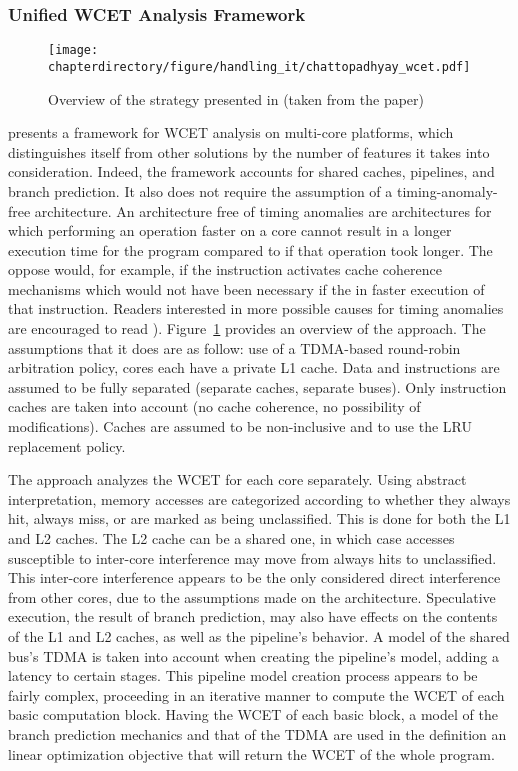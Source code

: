 \stopallthesefloats

\subsubsection{Unified WCET Analysis Framework}
\begin{figure}
\centering
\texttt{[image: \\chapterdirectory/figure/handling\_it/chattopadhyay\_wcet.pdf]}
\caption{%
Overview of the strategy presented in \cite{10.1145/2584654} (taken from the
paper)
}
\label{fig:handling_it:chattopadhyay}
\end{figure}
\cite{10.1145/2584654} presents a framework for WCET analysis on multi-core
platforms, which distinguishes itself from other solutions by the number of
features it takes into consideration. Indeed, the framework accounts for shared
caches, pipelines, and branch prediction. It also does not require the
assumption of a timing-anomaly-free architecture. An architecture free of
timing anomalies are architectures for which performing an operation faster on
a core cannot result in a longer execution time for the program compared to if
that operation took longer. The oppose would, for example, if the instruction
activates cache coherence mechanisms which would not have been necessary if the
in faster execution of that instruction. Readers interested in more possible
causes for timing anomalies are encouraged to read
\cite{DBLP:conf/wcet/ReinekeWTWPEB06}).
Figure~\ref{fig:handling_it:chattopadhyay} provides an overview of the
approach.  The assumptions that it does are as follow: use of a TDMA-based
round-robin arbitration policy, cores each have a private L1 cache. Data and
instructions are assumed to be fully separated (separate caches, separate
buses). Only instruction caches are taken into account (no cache coherence, no
possibility of modifications). Caches are assumed to be non-inclusive and to
use the LRU replacement policy.

The approach analyzes the WCET for each core separately.  Using abstract
interpretation, memory accesses are categorized according to whether they
always hit, always miss, or are marked as being unclassified. This is done for
both the L1 and L2 caches. The L2 cache can be a shared one, in which case
accesses susceptible to inter-core interference may move from always hits to
unclassified. This inter-core interference appears to be the only considered
direct interference from other cores, due to the assumptions made on the
architecture. Speculative execution, the result of branch prediction, may also
have effects on the contents of the L1 and L2 caches, as well as the pipeline's
behavior. A model of the shared bus's TDMA is taken into account when creating
the pipeline's model, adding a latency to certain stages. This pipeline model
creation process appears to be fairly complex, proceeding in an iterative
manner to compute the WCET of each basic computation block. Having the WCET of
each basic block, a model of the branch prediction mechanics and that of the
TDMA are used in the definition an linear optimization objective that will
return the WCET of the whole program.
